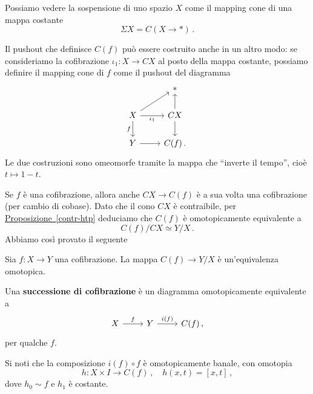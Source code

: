 \begin{ex}
	Possiamo vedere la sospensione di uno spazio $X$ 
	come il mapping cone di una mappa costante
	\begin{equation*}
		\Sigma X = C(X \to \ast)\,.
	\end{equation*}
\end{ex}

\begin{oss}
	Il pushout che definisce $C(f)$ può essere costruito anche in un altro modo:
	se consideriamo la cofibrazione $\iota_{1}:X \to CX$ al posto della mappa costante,
	possiamo definire il mapping cone di $f$ come il pushout del diagramma
	\begin{equation*}
		\begin{tikzcd}
			& \ast 			 \\
			X \ar[r, "\iota_{1}"'] \ar[d, "f"']  \ar[ur] & CX \ar[d] \ar[u] \\
			Y \ar[r] & C(f)\,.
		\end{tikzcd}
	\end{equation*}
	Le due costruzioni sono omeomorfe tramite la mappa che ``inverte il tempo'',
	cioè $t \mapsto 1-t$.
\end{oss}


	Se $f$ è una cofibrazione, allora anche $CX \to C(f)$ è a sua volta
	una cofibrazione (per cambio di cobase).
	Dato che il cono $CX$ è contraibile, 
	per \hyperref[contr-htp]{Proposizione~\ref*{contr-htp}}
	deduciamo che $C(f)$ è omotopicamente equivalente a
	\begin{equation*}
		C(f) / CX \simeq Y/X\,.
	\end{equation*}
	Abbiamo così provato il seguente

\begin{lemma}\label{cone-quotionet}
	Sia $f:X \to Y$ una cofibrazione. La mappa $C(f) \to Y/X$
	è un'equivalenza omotopica.
\end{lemma}

\begin{df}
	Una \textbf{successione di cofibrazione}
	è un diagramma omotopicamente equivalente a
	\begin{equation*}
		\begin{tikzcd}
			X \ar[r, "f"] & Y \ar[r, "i(f)"] & C(f)\,,
		\end{tikzcd}
	\end{equation*}
	per qualche $f$.
\end{df}

Si noti che la composizione $i(f) \circ f$ è
omotopicamente banale, con omotopia
\begin{equation*}
	h:X \times I \longrightarrow C(f)\,, \quad
	h(x,t) = [x,t]\,,
\end{equation*}
dove $h_{0} \sim f$ e $h_{1}$ è costante.

